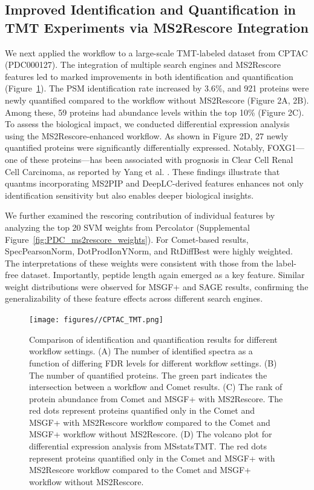 \documentclass[12pt]{article}
\begin{document}
\subsection{Improved Identification and Quantification in TMT Experiments via MS2Rescore Integration}
We next applied the workflow to a large-scale TMT-labeled dataset from CPTAC (PDC000127). The integration of multiple search engines and MS2Rescore features led to marked improvements in both identification and quantification (Figure~\ref{fig:PDC_ms2rescore}). The PSM identification rate increased by 3.6\%, and 921 proteins were newly quantified compared to the workflow without MS2Rescore (Figure 2A, 2B). Among these, 59 proteins had abundance levels within the top 10\% (Figure 2C). To assess the biological impact, we conducted differential expression analysis using the MS2Rescore-enhanced workflow. As shown in Figure 2D, 27 newly quantified proteins were significantly differentially expressed. Notably, FOXG1—one of these proteins—has been associated with prognosis in Clear Cell Renal Cell Carcinoma, as reported by Yang et al. \cite{yang_comprehensive_2022}. These findings illustrate that quantms incorporating MS2PIP and DeepLC-derived features enhances not only identification sensitivity but also enables deeper biological insights.

We further examined the rescoring contribution of individual features by analyzing the top 20 SVM weights from Percolator (Supplemental Figure~\ref{fig:PDC_ms2rescore_weights}). For Comet-based results, SpecPearsonNorm, DotProdIonYNorm, and RtDiffBest were highly weighted. The interpretations of these weights were consistent with those from the label-free dataset. Importantly, peptide length again emerged as a key feature. Similar weight distributions were observed for MSGF+ and SAGE results, confirming the generalizability of these feature effects across different search engines.

\begin{figure}[ht!]
	\centering
	\texttt{[image: figures//CPTAC\_TMT.png]}
	\caption{Comparison of identification and quantification results for different workflow settings. (A) The number of identified spectra as a function of differing FDR levels for different workflow settings. (B) The number of quantified proteins. The green part indicates the intersection between a workflow and Comet results. (C) The rank of protein abundance from Comet and MSGF+ with MS2Rescore. The red dots represent proteins quantified only in the Comet and MSGF+ with MS2Rescore workflow compared to the Comet and MSGF+ workflow without MS2Rescore. (D) The volcano plot for differential expression analysis from MSstatsTMT. The red dots represent proteins quantified only in the Comet and MSGF+ with MS2Rescore workflow compared to the Comet and MSGF+ workflow without MS2Rescore.}
	\label{fig:PDC_ms2rescore}
\end{figure}
\end{document}
